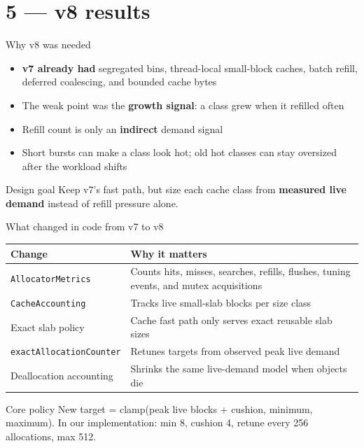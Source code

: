 \section{5 --- v8 results}

\begin{frame}{Why v8 was needed}
    \begin{itemize}
        \item \textbf{v7 already had} segregated bins, thread-local small-block
              caches, batch refill, deferred coalescing, and bounded cache bytes
        \item The weak point was the \textbf{growth signal}: a class grew when it
              refilled often
        \item Refill count is only an \textbf{indirect} demand signal
        \item Short bursts can make a class look hot; old hot classes can stay
              oversized after the workload shifts
    \end{itemize}

    \vspace{0.5em}
    \begin{block}{Design goal}
        Keep v7's fast path, but size each cache class from
        \textbf{measured live demand} instead of refill pressure alone.
    \end{block}
\end{frame}

\begin{frame}{What changed in code from v7 to v8}
    {\scriptsize
    \renewcommand{\arraystretch}{1.35}
    \begin{tabular}{@{}p{}p{}@{}}
        \toprule
        Change & Why it matters \\
        \midrule
        \texttt{AllocatorMetrics} & Counts hits, misses, searches, refills,
        flushes, tuning events, and mutex acquisitions \\
        \texttt{CacheAccounting} & Tracks live small-slab blocks per size class \\
        Exact slab policy & Cache fast path only serves exact reusable slab sizes \\
        \texttt{exactAllocationCounter} & Retunes targets from observed peak live
        demand \\
        Deallocation accounting & Shrinks the same live-demand model when objects die \\
        \bottomrule
    \end{tabular}
    }

    \vspace{0.5em}
    \begin{block}{Core policy}
        New target = clamp(peak live blocks + cushion, minimum, maximum).
        In our implementation: min 8, cushion 4, retune every 256 allocations,
        max 512.
    \end{block}
\end{frame}

